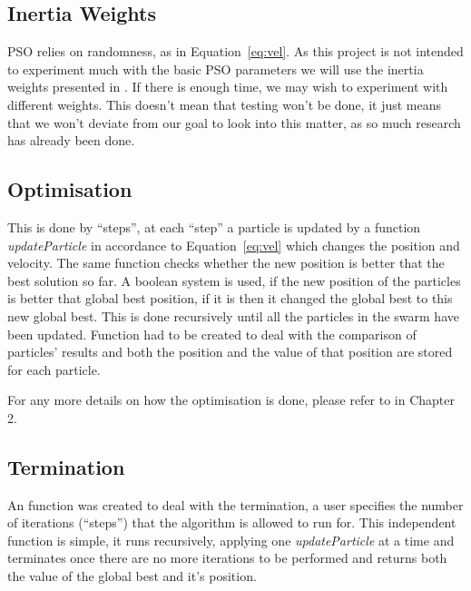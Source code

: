 \documentclass{pdfmx4020}
\begin{document}
    \subsection{Inertia Weights} %
    \label{sub:inertia_weights}
    PSO relies on randomness, as in Equation~\ref{eq:vel}. As this project is not intended to experiment much with the basic PSO parameters we will use the inertia weights presented in \cite{constriction_factor_3}. If there is enough time, we may wish to experiment with different weights. This doesn't mean that testing won't be done, it just means that we won't deviate from our goal to look into this matter, as so much research has already been done\cite{inertia}.
    \subsection{Optimisation} %
    \label{sub:optimisation}
    This is done by ``steps'', at each ``step'' a particle is updated by a function \textit{updateParticle} in accordance to Equation~\ref{eq:vel} which changes the position and velocity. The same function checks whether the new position is better that the best solution so far. A boolean system is used, if the new position of the particles is better that global best position, if it is then it changed the global best to this new global best. This is done recursively until all the particles in the swarm have been updated. Function had to be created to deal with the comparison of particles' results and both the position and the value of that position are stored for each particle. 

    For any more details on how the optimisation is done, please refer to  in Chapter 2.
    \subsection{Termination} %
    \label{sub:termination}
    An function was created to deal with the termination, a user specifies the number of iterations (``steps'') that the algorithm is allowed to run for. This independent function is simple, it runs recursively, applying one \textit{updateParticle} at a time and terminates once there are no more iterations to be performed and returns both the value of the global best and it's position. 
\end{document}
